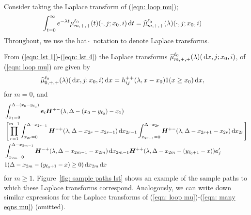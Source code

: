 Consider taking the Laplace transform of (\ref{eqn: loop mu});
\begin{align}
	\int_{t=0}^\infty e^{-\lambda t} \mu^{\ell_0}_{m,+,+}(t)(\cdot, j; x_0,i)  \, \mathrm{d} t  
	&= \widehat \mu^{\ell_0}_{m,+,+}(\lambda)( \cdot, j; x_0,i)    \label{eqn: loop mu2}
\end{align}
Throughout, we use the hat \(\,\widehat{}\,\)  notation to denote Laplace transforms. 

From (\ref{eqn: lst 1})-(\ref{eqn: lst 4}) the Laplace transforms \(\widehat \mu^{\ell_0}_{m,+,+}(\lambda)( \, \mathrm{d} x, j; x_0,i)\), of (\ref{eqn: loop mu}) are given by 
\begin{align*}
	\widehat \mu^{\ell_0}_{0,+,+}(\lambda)( \, \mathrm{d} x,j;x_0,i) \, \mathrm{d} x&= h_{ij}^{++}(\lambda,x-x_0)1(x\geq x_0)\, \mathrm{d} x,
\end{align*}
for \(m=0\),  and 
\begin{align}
	\nonumber&\int_{x_1 = 0}^{\Delta-(x_0-y_{\ell_0})} \boldsymbol e_i \boldsymbol H^{+-}(\lambda,\Delta-(x_0-y_{\ell_0})-x_1)  
	\\&  \nonumber\left[\prod_{r=1}^{m-1} \int_{x_{2r}=0}^{\Delta-x_{2r-1}} \boldsymbol H^{-+}(\lambda,\Delta-x_{2r}-x_{2r-1})\, \mathrm{d} x_{2r-1}\int_{x_{2r+1}=0}^{\Delta-x_{2r}}\boldsymbol H^{+-}(\lambda,\Delta-x_{2r+1}-x_{2r})\, \mathrm{d} x_{2r}\right]
	\\& \int_{x_{2m}=0}^{\Delta-x_{2m-1}} \boldsymbol H^{-+}(\lambda,\Delta -x_{2m-1} - x_{2m}) \, \mathrm{d} x_{2m-1}\boldsymbol H^{++}(\lambda,\Delta -x_{2m}- (y_{\ell_0+1}- x))\boldsymbol e_j'{} \nonumber	
	\\& 1(\Delta-x_{2m}-(y_{\ell_0+1}-x)\geq 0)\, \mathrm{d} x_{2m} \, \mathrm{d} x \label{eqn: lst herwe}
\end{align} 
for \(m\geq 1\). Figure~\ref{fig: sample paths lst} shows an example of the sample paths to which these Laplace transforms correspond.  Analogously, we can write down similar expressions for the Laplace transforms of (\ref{eqn: loop mu})-(\ref{eqn: many eqns mu}) (omitted).

